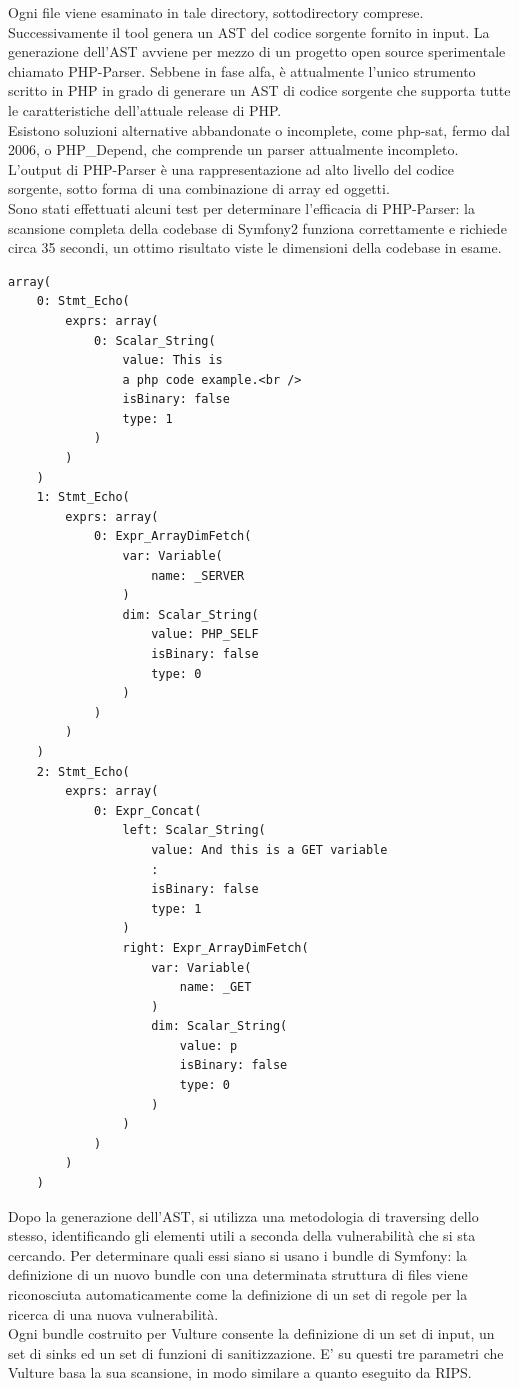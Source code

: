 Ogni file viene esaminato in tale directory, sottodirectory comprese.\\
Successivamente il tool genera un AST del codice sorgente fornito in input. La generazione dell'AST avviene per mezzo di un progetto open source sperimentale chiamato PHP-Parser\cite{phpparser}. Sebbene in fase alfa, è attualmente l'unico strumento scritto in PHP in grado di generare un AST di codice sorgente che supporta tutte le caratteristiche dell'attuale release di PHP. \\
Esistono soluzioni alternative abbandonate o incomplete, come php-sat\cite{phpsat}, fermo dal 2006, o PHP\_Depend\cite{phpdepend}, che comprende un parser attualmente incompleto.
\newpage
L'output di PHP-Parser è una rappresentazione ad alto livello del codice sorgente, sotto forma di una combinazione di array ed oggetti. \\
Sono stati effettuati alcuni test per determinare l'efficacia di PHP-Parser: la scansione completa della codebase di Symfony2 funziona correttamente e richiede circa 35 secondi, un ottimo risultato viste le dimensioni della codebase in esame.\\

\begin{lstlisting}
array(
    0: Stmt_Echo(
        exprs: array(
            0: Scalar_String(
                value: This is 
                a php code example.<br />
                isBinary: false
                type: 1
            )
        )
    )
    1: Stmt_Echo(
        exprs: array(
            0: Expr_ArrayDimFetch(
                var: Variable(
                    name: _SERVER
                )
                dim: Scalar_String(
                    value: PHP_SELF
                    isBinary: false
                    type: 0
                )
            )
        )
    )
    2: Stmt_Echo(
        exprs: array(
            0: Expr_Concat(
                left: Scalar_String(
                    value: And this is a GET variable
                    : 
                    isBinary: false
                    type: 1
                )
                right: Expr_ArrayDimFetch(
                    var: Variable(
                        name: _GET
                    )
                    dim: Scalar_String(
                        value: p
                        isBinary: false
                        type: 0
                    )
                )
            )
        )
    )
\end{lstlisting}

Dopo la generazione dell'AST, si utilizza una metodologia di traversing dello stesso, identificando gli elementi utili a seconda della vulnerabilità che si sta cercando. Per determinare quali essi siano si usano i bundle di Symfony: la definizione di un nuovo bundle con una determinata struttura di files viene riconosciuta automaticamente come la definizione di un set di regole per la ricerca di una nuova vulnerabilità.\\
Ogni bundle costruito per Vulture consente la definizione di un set di input, un set di sinks ed un set di funzioni di sanitizzazione. E' su questi tre parametri che Vulture basa la sua scansione, in modo similare a quanto eseguito da RIPS.
 
